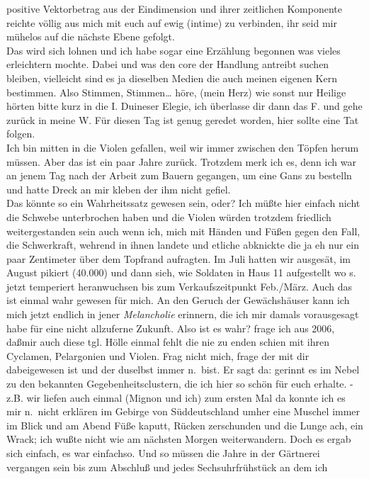 \documentclass[
]{article}
\begin{document}
positive Vektorbetrag aus der Eindimension und ihrer zeitlichen
Komponente reichte völlig aus mich mit euch auf ewig (intime) zu
verbinden, ihr seid mir mühelos auf die nächste Ebene gefolgt.\\
Das wird sich lohnen und ich habe sogar eine Erzählung begonnen was
vieles erleichtern mochte. Dabei und was den core der Handlung antreibt
suchen bleiben, vielleicht sind es ja dieselben Medien die auch meinen
eigenen Kern bestimmen. Also Stimmen, Stimmen\ldots{} höre, (mein Herz)
wie sonst nur Heilige hörten bitte kurz in die I. Duineser Elegie, ich
überlasse dir dann das F. und gehe zurück in meine W. Für diesen Tag ist
genug geredet worden, hier sollte eine Tat folgen.\\
Ich bin mitten in die Violen gefallen, weil wir immer zwischen den
Töpfen herum müssen. Aber das ist ein paar Jahre zurück. Trotzdem merk
ich es, denn ich war an jenem Tag nach der Arbeit zum Bauern gegangen,
um eine Gans zu bestelln und hatte Dreck an mir kleben der ihm nicht
gefiel.\\
Das könnte so ein Wahrheitssatz gewesen sein, oder? Ich müßte hier
einfach nicht die Schwebe unterbrochen haben und die Violen würden
trotzdem friedlich weitergestanden sein auch wenn ich, mich mit Händen
und Füßen gegen den Fall, die Schwerkraft, wehrend in ihnen landete und
etliche abknickte die ja eh nur ein paar Zentimeter über dem Topfrand
aufragten. Im Juli hatten wir ausgesät, im August pikiert (40.000) und
dann sieh, wie Soldaten in Haus 11 aufgestellt wo s. jetzt temperiert
heranwuchsen bis zum Verkaufszeitpunkt Feb./März. Auch das ist einmal
wahr gewesen für mich. An den Geruch der Gewächshäuser kann ich mich
jetzt endlich in jener \emph{Melancholie} erinnern, die ich mir damals
vorausgesagt habe für eine nicht allzuferne Zukunft. Also ist es wahr?
frage ich aus 2006, daßmir auch diese tgl. Hölle einmal fehlt die nie zu
enden schien mit ihren Cyclamen, Pelargonien und Violen. Frag nicht
mich, frage der mit dir dabeigewesen ist und der duselbst immer n.~bist.
Er sagt da: gerinnt es im Nebel zu den bekannten Gegebenheitsclustern,
die ich hier so schön für euch erhalte. - z.B. wir liefen auch einmal
(Mignon und ich) zum ersten Mal da konnte ich es mir n.~nicht erklären
im Gebirge von Süddeutschland umher eine Muschel immer im Blick und am
Abend Füße kaputt, Rücken zerschunden und die Lunge ach, ein Wrack; ich
wußte nicht wie am nächsten Morgen weiterwandern. Doch es ergab sich
einfach, es war einfachso. Und so müssen die Jahre in der Gärtnerei
vergangen sein bis zum Abschluß und jedes Sechsuhrfrühstück an dem ich
\end{document}
